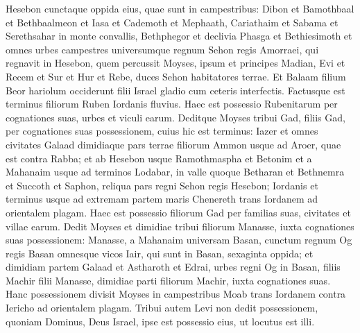 \begin{biblechapter}
\begin{biblechapter}
\begin{biblechapter}
\begin{biblechapter}
\begin{biblechapter}
\begin{biblechapter}
\begin{biblechapter}
\begin{biblechapter}
\begin{biblechapter}
\begin{biblechapter}
\begin{biblechapter}
\begin{biblechapter}
\begin{biblechapter}
\verse Hesebon cunctaque oppida eius, quae sunt in campestribus: Dibon et Bamothbaal et Bethbaalmeon 
\verse et Iasa et Cademoth et Mephaath, 
\verse Cariathaim et Sabama et Serethsahar in monte convallis, 
\verse Bethphegor et declivia Phasga et Bethiesimoth 
\verse et omnes urbes campestres universumque regnum Sehon regis Amorraei, qui regnavit in Hesebon, quem percussit Moyses, ipsum et principes Madian, Evi et Recem et Sur et Hur et Rebe, duces Sehon habitatores terrae. 
\verse Et Balaam filium Beor hariolum occiderunt filii Israel gladio cum ceteris interfectis. 
 \verse Factusque est terminus filiorum Ruben Iordanis fluvius. Haec est possessio Rubenitarum per cognationes suas, urbes et viculi earum.
 \verse Deditque Moyses tribui Gad, filiis Gad, per cognationes suas possessionem, cuius hic est 
\verse terminus: Iazer et omnes civitates Galaad dimidiaque pars terrae filiorum Ammon usque ad Aroer, quae est contra Rabba; 
\verse et ab Hesebon usque Ramothmaspha et Betonim et a Mahanaim usque ad terminos Lodabar, 
 \verse in valle quoque Betharan et Bethnemra et Succoth et Saphon, reliqua pars regni Sehon regis Hesebon; Iordanis et terminus usque ad extremam partem maris Chenereth trans Iordanem ad orientalem plagam. 
\verse Haec est possessio filiorum Gad per familias suas, civitates et villae earum.
 \verse Dedit Moyses et dimidiae tribui filiorum Manasse, iuxta cognationes suas possessionem: 
\verse Manasse, a Mahanaim universam Basan, cunctum regnum Og regis Basan omnesque vicos Iair, qui sunt in Basan, sexaginta oppida; 
\verse et dimidiam partem Galaad et Astharoth et Edrai, urbes regni Og in Basan, filiis Machir filii Manasse, dimidiae parti filiorum Machir, iuxta cognationes suas.
 \verse Hanc possessionem divisit Moyses in campestribus Moab trans Iordanem contra Iericho ad orientalem plagam. 
\verse Tribui autem Levi non dedit possessionem, quoniam Dominus, Deus Israel, ipse est possessio eius, ut locutus est illi.
 

\end{biblechapter}
\end{biblechapter}
\end{biblechapter}
\end{biblechapter}
\end{biblechapter}
\end{biblechapter}
\end{biblechapter}
\end{biblechapter}
\end{biblechapter}
\end{biblechapter}
\end{biblechapter}
\end{biblechapter}
\end{biblechapter}
